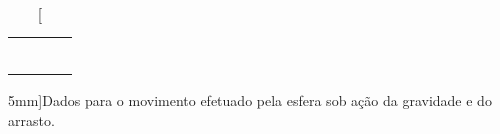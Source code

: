 \begin{table*}[!h]
\begin{tabular}{lp{25mm}p{25mm}l}
	& \cellcolor[gray]{0.89} & \cellcolor[gray]{0.92} \\
	& \cellcolor[gray]{0.95} & \cellcolor[gray]{0.97} \\
	& \cellcolor[gray]{0.89} & \cellcolor[gray]{0.92} \\
	& \cellcolor[gray]{0.95} & \cellcolor[gray]{0.97} \\
	& \cellcolor[gray]{0.89} & \cellcolor[gray]{0.92} \\
	& \cellcolor[gray]{0.95} & \cellcolor[gray]{0.97} \\
	\cmidrule{2-3}
\bottomrule
\end{tabular}
\caption[][5mm]{Dados para o movimento efetuado pela esfera sob ação da gravidade e do arrasto.}
\label{TabelaDados}
\end{table*}
